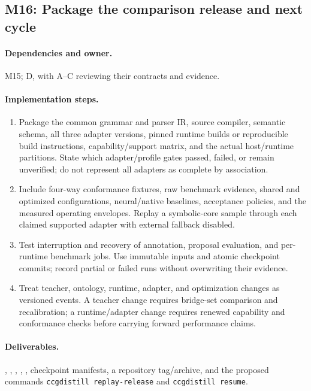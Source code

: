 \documentclass[11pt,a4paper]{article}
\begin{document}
\subsection{M16: Package the comparison release and next cycle}

\paragraph{Dependencies and owner.} M15; D, with A--C reviewing their
contracts and evidence.

\paragraph{Implementation steps.}
\begin{enumerate}
\item Package the common grammar and parser IR, source compiler, semantic
schema, all three adapter versions, pinned runtime builds or reproducible
build instructions, capability/support matrix, and the actual host/runtime
partitions. State which adapter/profile gates passed, failed, or remain
unverified; do not represent all adapters as complete by association.
\item Include four-way conformance fixtures, raw benchmark evidence, shared
and optimized configurations, neural/native baselines, acceptance policies,
and the measured operating envelopes. Replay a symbolic-core sample through
each claimed supported adapter with external fallback disabled.
\item Test interruption and recovery of annotation, proposal evaluation, and
per-runtime benchmark jobs. Use immutable inputs and atomic checkpoint
commits; record partial or failed runs without overwriting their evidence.
\item Treat teacher, ontology, runtime, adapter, and optimization changes as
versioned events. A teacher change requires bridge-set comparison and
recalibration; a runtime/adapter change requires renewed capability and
conformance checks before carrying forward performance claims.
\end{enumerate}

\paragraph{Deliverables.} ,
, ,
, , checkpoint
manifests, a repository tag/archive, and the proposed commands
\texttt{ccgdistill replay-release} and \texttt{ccgdistill resume}.
\end{document}

